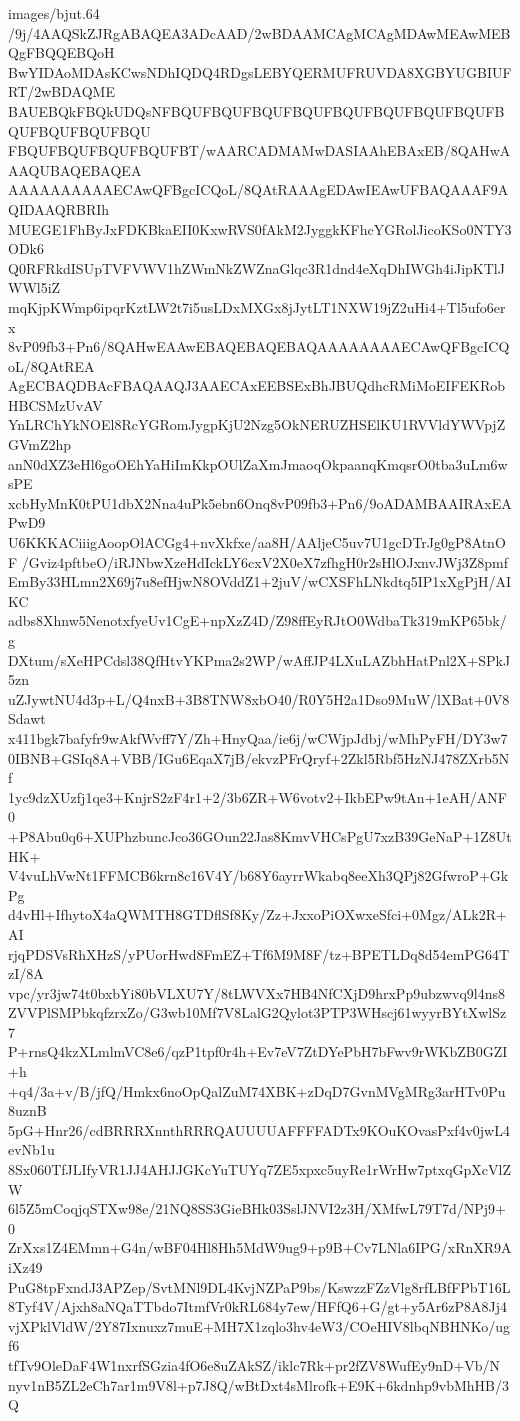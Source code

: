 \begin{filecontents*}{images/bjut.64}
/9j/4AAQSkZJRgABAQEA3ADcAAD/2wBDAAMCAgMCAgMDAwMEAwMEBQgFBQQEBQoH
BwYIDAoMDAsKCwsNDhIQDQ4RDgsLEBYQERMUFRUVDA8XGBYUGBIUFRT/2wBDAQME
BAUEBQkFBQkUDQsNFBQUFBQUFBQUFBQUFBQUFBQUFBQUFBQUFBQUFBQUFBQUFBQU
FBQUFBQUFBQUFBQUFBT/wAARCADMAMwDASIAAhEBAxEB/8QAHwAAAQUBAQEBAQEA
AAAAAAAAAAECAwQFBgcICQoL/8QAtRAAAgEDAwIEAwUFBAQAAAF9AQIDAAQRBRIh
MUEGE1FhByJxFDKBkaEII0KxwRVS0fAkM2JyggkKFhcYGRolJicoKSo0NTY3ODk6
Q0RFRkdISUpTVFVWV1hZWmNkZWZnaGlqc3R1dnd4eXqDhIWGh4iJipKTlJWWl5iZ
mqKjpKWmp6ipqrKztLW2t7i5usLDxMXGx8jJytLT1NXW19jZ2uHi4+Tl5ufo6erx
8vP09fb3+Pn6/8QAHwEAAwEBAQEBAQEBAQAAAAAAAAECAwQFBgcICQoL/8QAtREA
AgECBAQDBAcFBAQAAQJ3AAECAxEEBSExBhJBUQdhcRMiMoEIFEKRobHBCSMzUvAV
YnLRChYkNOEl8RcYGRomJygpKjU2Nzg5OkNERUZHSElKU1RVVldYWVpjZGVmZ2hp
anN0dXZ3eHl6goOEhYaHiImKkpOUlZaXmJmaoqOkpaanqKmqsrO0tba3uLm6wsPE
xcbHyMnK0tPU1dbX2Nna4uPk5ebn6Onq8vP09fb3+Pn6/9oADAMBAAIRAxEAPwD9
U6KKKACiiigAoopOlACGg4+nvXkfxe/aa8H/AAljeC5uv7U1gcDTrJg0gP8AtnOF
/Gviz4pftbeO/iRJNbwXzeHdIckLY6cxV2X0eX7zfhgH0r2sHlOJxnvJWj3Z8pmf
EmBy33HLmn2X69j7u8efHjwN8OVddZ1+2juV/wCXSFhLNkdtq5IP1xXgPjH/AIKC
adbs8Xhnw5NenotxfyeUv1CgE+npXzZ4D/Z98ffEyRJtO0WdbaTk319mKP65bk/g
DXtum/sXeHPCdsl38QfHtvYKPma2s2WP/wAffJP4LXuLAZbhHatPnl2X+SPkJ5zn
uZJywtNU4d3p+L/Q4nxB+3B8TNW8xbO40/R0Y5H2a1Dso9MuW/lXBat+0V8Sdawt
x411bgk7bafyfr9wAkfWvff7Y/Zh+HnyQaa/ie6j/wCWjpJdbj/wMhPyFH/DY3w7
0IBNB+GSIq8A+VBB/IGu6EqaX7jB/ekvzPFrQryf+2Zkl5Rbf5HzNJ478ZXrb5Nf
1yc9dzXUzfj1qe3+KnjrS2zF4r1+2/3b6ZR+W6votv2+IkbEPw9tAn+1eAH/ANF0
+P8Abu0q6+XUPhzbuncJco36GOun22Jas8KmvVHCsPgU7xzB39GeNaP+1Z8UtHK+
V4vuLhVwNt1FFMCB6krn8c16V4Y/b68Y6ayrrWkabq8eeXh3QPj82GfwroP+GkPg
d4vHl+IfhytoX4aQWMTH8GTDflSf8Ky/Zz+JxxoPiOXwxeSfci+0Mgz/ALk2R+AI
rjqPDSVsRhXHzS/yPUorHwd8FmEZ+Tf6M9M8F/tz+BPETLDq8d54emPG64TzI/8A
vpc/yr3jw74t0bxbYi80bVLXU7Y/8tLWVXx7HB4NfCXjD9hrxPp9ubzwvq9l4ns8
ZVVPlSMPbkqfzrxZo/G3wb10Mf7V8LalG2Qylot3PTP3WHscj61wyyrBYtXwlSz7
P+rnsQ4kzXLmlmVC8e6/qzP1tpf0r4h+Ev7eV7ZtDYePbH7bFwv9rWKbZB0GZI+h
+q4/3a+v/B/jfQ/Hmkx6noOpQalZuM74XBK+zDqD7GvnMVgMRg3arHTv0Pu8uznB
5pG+Hnr26/cdBRRRXnnthRRRQAUUUUAFFFFADTx9KOuKOvasPxf4v0jwL4evNb1u
8Sx060TfJLIfyVR1JJ4AHJJGKcYuTUYq7ZE5xpxc5uyRe1rWrHw7ptxqGpXcVlZW
6l5Z5mCoqjqSTXw98e/21NQ8SS3GieBHk03SslJNVI2z3H/XMfwL79T7d/NPj9+0
ZrXxs1Z4EMmn+G4n/wBF04Hl8Hh5MdW9ug9+p9B+Cv7LNla6IPG/xRnXR9AiXz49
PuG8tpFxndJ3APZep/SvtMNl9DL4KvjNZPaP9bs/KswzzFZzVlg8rfLBfFPbT16L
8Tyf4V/Ajxh8aNQaTTbdo7ItmfVr0kRL684y7ew/HFfQ6+G/gt+y5Ar6zP8A8Jj4
vjXPklVldW/2Y87Ixnuxz7muE+MH7X1zqlo3hv4eW3/COeHIV8lbqNBHNKo/ugf6
tfTv9OleDaF4W1nxrfSGzia4fO6e8uZAkSZ/iklc7Rk+pr2fZV8WufEy9nD+Vb/N
nyv1nB5ZL2eCh7ar1m9V8l+p7J8Q/wBtDxt4sMlrofk+E9K+6kdnhp9vbMhHB/3Q

\end{filecontents*}
